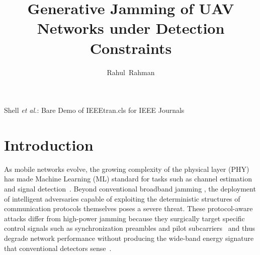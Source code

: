 \documentclass[conference]{IEEEtran}
\newcommand{\adm}[1]{{\color{orange}{[#1]}}}
\newcommand{\rar}[1]{{\color{blue}{[#1]}}}
\begin{document}
\title{\rar{Cooperative Multi-Agent} Generative Jamming
of UAV Networks under Detection Constraints}
\author{Rahul~Rahman}%

%
{Shell \MakeLowercase{\textit{et al.}}: Bare Demo of IEEEtran.cls for IEEE Journals}

\maketitle

\begin{abstract}
\rar{Write last.}
\end{abstract}


\begin{IEEEkeywords}
\rar{Write last.}
\end{IEEEkeywords}






%
\IEEEpeerreviewmaketitle


\section{Introduction}
As mobile networks evolve, the growing complexity of the physical layer (PHY) has made Machine Learning (ML) standard for tasks such as channel estimation and signal detection~\cite{jamming_survey_2024}.
Beyond conventional broadband jamming \adm{cite?}, the deployment of intelligent adversaries capable of exploiting the deterministic structures of communication protocols themselves poses a severe threat.
These protocol-aware attacks differ from high-power jamming because they surgically target specific control signals such as synchronization preambles and pilot subcarriers~\cite{zhang2023detection} and thus degrade network performance without producing the wide-band energy signature that conventional detectors sense~\cite{jamming_survey_2024}.
\end{document}
